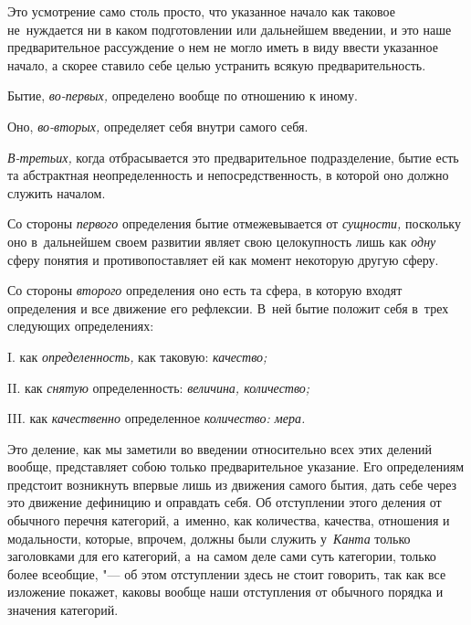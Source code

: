Это усмотрение само столь просто, что указанное начало как таковое
не~нуждается ни в каком подготовлении или дальнейшем введении, и это наше
предварительное рассуждение о нем не могло иметь в виду ввести указанное
начало, а скорее ставило себе целью устранить всякую предварительность.


Бытие, {\em во-первых,} определено вообще по отношению к иному.

Оно, {\em во-вторых,} определяет себя внутри самого себя.

{\em В-третьих,} когда отбрасывается это предварительное
подразделение, бытие есть та абстрактная неопределенность и
непосредственность, в которой оно должно служить началом.

Со стороны {\em первого} определения бытие отмежевывается от {\em сущности,}
поскольку оно в~дальнейшем своем развитии являет свою целокупность лишь как
{\em одну} сферу понятия и противопоставляет ей как момент
некоторую другую сферу.

Со стороны {\em второго} определения оно есть та сфера, в которую входят
определения и все движение его рефлексии. В~ней бытие положит себя в~трех
следующих определениях:

I. как {\em определенность,} как таковую: {\em качество;}

II. как {\em снятую} определенность: {\em величина, количество;}

III. как {\em качественно} определенное {\em количество: мера.}

Это деление, как мы заметили во введении относительно всех этих делений вообще,
представляет собою только предварительное указание. Его определениям предстоит
возникнуть впервые лишь из движения самого бытия, дать себе через это движение
дефиницию и оправдать себя. Об отступлении этого деления от обычного перечня
категорий, а~именно, как количества, качества, отношения и модальности,
которые, впрочем, должны были служить у~{\em Канта} только заголовками для его
категорий, а~на самом деле сами суть категории, только более всеобщие, "--- об
этом отступлении здесь не стоит говорить, так как все изложение покажет, каковы
вообще наши отступления от обычного порядка и значения категорий.

